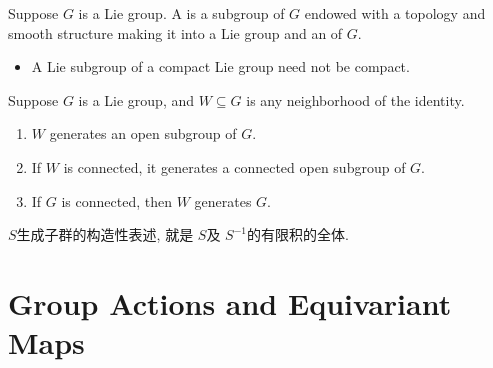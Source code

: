 \documentclass[../main.tex]{subfiles}
\begin{document}
\begin{definition}{}{}
    Suppose $G$ is a Lie group. A  is a subgroup of $G$ endowed with a topology and smooth structure making it into a Lie group and an  of $G$. 
\end{definition}
\begin{remark}
    
\begin{itemize}
    \item A Lie subgroup of a compact Lie group need not be compact.
\end{itemize}
\end{remark}
\begin{proposition}{}{}
Suppose \(G\) is a Lie group, and \(W \subseteq G\) is any neighborhood of the identity.

\begin{enumerate}
\item \(W\) generates an open subgroup of \(G\).
\item If \(W\) is connected, it generates a connected open subgroup of \(G\).
\item If \(G\) is connected, then \(W\) generates \(G\).
\end{enumerate}
\end{proposition}

\begin{note}
    \(  S  \)生成子群的构造性表述, 就是 \(  S  \)及 \(  S^{-1}   \)的有限积的全体.   
\end{note}

\section{Group Actions and Equivariant Maps}
\end{document}

